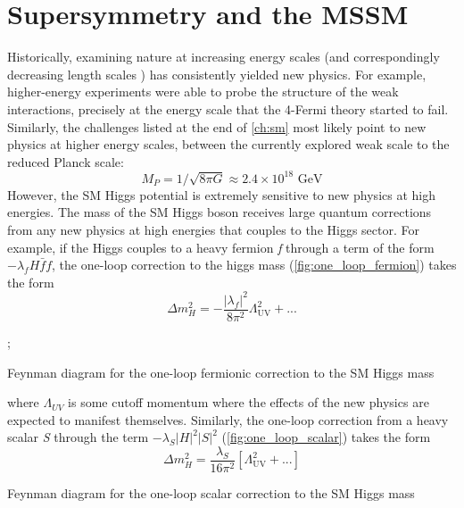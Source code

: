 \chapter{Supersymmetry and the MSSM}\label{ch:supersymmetry}

Historically, examining nature at increasing energy scales (and correspondingly decreasing length scales ) has consistently yielded new physics. For example, higher-energy experiments were able to probe the structure of the weak interactions, precisely at the energy scale that the 4-Fermi theory started to fail. Similarly, the challenges listed at the end of \autoref{ch:sm} most likely point to new physics at higher energy scales, between the currently explored weak scale to the reduced Planck scale:
\begin{equation*}
M_P = 1/\sqrt{8\pi G} \approx 2.4\times 10^{18} \text{ GeV}
\end{equation*}
However, the SM Higgs potential is extremely sensitive to new physics at high energies. The mass of the SM Higgs boson receives large quantum corrections from any new physics at high energies that couples to the Higgs sector. For example, if the Higgs couples to a heavy fermion \emph{f} through a term of the form $-\lambda_fH\bar{f}f$, the one-loop correction to the higgs mass (\autoref{fig:one_loop_fermion}) takes the form
\begin{equation}
\Delta m_H^2 = -\frac{|\lambda_f|^2}{8\pi^2}\Lambda_\text{UV}^2 + ...
\label{eq:one_loop_fermion}
\end{equation}
\begin{marginfigure}
;
\caption{Feynman diagram for the one-loop fermionic correction to the SM Higgs mass}
\label{fig:one_loop_fermion}
\end{marginfigure}
where $\Lambda_{UV}$ is some cutoff momentum where the effects of the new physics are expected to manifest themselves. Similarly, the one-loop correction from a heavy scalar \emph{S} through the term $-\lambda_S|H|^2|S|^2$ (\autoref{fig:one_loop_scalar}) takes the form
\begin{equation}
  \Delta m_H^2 = \frac{\lambda_S}{16\pi^2}\left[\Lambda_\text{UV}^2 + ...\right]
\label{eq:one_loop_scalar}
\end{equation}
\begin{marginfigure}
\caption{Feynman diagram for the one-loop scalar correction to the SM Higgs mass}
\label{fig:one_loop_scalar}
\end{marginfigure}

